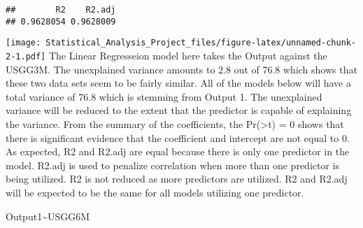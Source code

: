 \documentclass[]{article}
\newenvironment{Shaded}{\begin{snugshade}}{\end{snugshade}}
\newcommand{\KeywordTok}[1]{\textcolor[rgb]{0.13,0.29,0.53}{\textbf{#1}}}
\newcommand{\DataTypeTok}[1]{\textcolor[rgb]{0.13,0.29,0.53}{#1}}
\newcommand{\DecValTok}[1]{\textcolor[rgb]{0.00,0.00,0.81}{#1}}
\newcommand{\StringTok}[1]{\textcolor[rgb]{0.31,0.60,0.02}{#1}}
\newcommand{\OperatorTok}[1]{\textcolor[rgb]{0.81,0.36,0.00}{\textbf{#1}}}
\newcommand{\NormalTok}[1]{#1}
\begin{document}
\begin{Shaded}
\end{Shaded}

\begin{verbatim}
##        R2    R2.adj 
## 0.9628054 0.9628009
\end{verbatim}

\begin{Shaded}
\end{Shaded}

\texttt{[image: Statistical\_Analysis\_Project\_files/figure-latex/unnamed-chunk-2-1.pdf]}
The Linear Regresseion model here takes the Output against the USGG3M.
The unexplained variance amounts to 2.8 out of 76.8 which shows that
these two data sets seem to be fairly similar. All of the models below
will have a total variance of 76.8 which is stemming from Output 1. The
unexplained variance will be reduced to the extent that the predictor is
capable of explaining the variance. From the summary of the
coefficients, the Pr(\textgreater{}t) = 0 shows that there is
significant evidence that the coefficient and intercept are not equal to
0. As expected, R2 and R2.adj are equal because there is only one
predictor in the model. R2.adj is used to penalize correlation when more
than one predictor is being utilized. R2 is not reduced as more
predictors are utilized. R2 and R2.adj will be expected to be the same
for all models utilizing one predictor.

Output1\textasciitilde{}USGG6M

\begin{Shaded}
\end{Shaded}
\end{document}
